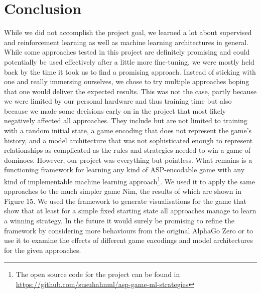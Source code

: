 \documentclass[12pt,a4paper]{article}
\begin{document}
\section{Conclusion}
While we did not accomplish the project goal, we learned a lot about supervised and reinforcement learning as well as machine learning architectures in general. While some approaches tested in this project are definitely promising and could potentially be used effectively after a little more fine-tuning, we were mostly held back by the time it took us to find a promising approach. Instead of sticking with one and really immersing ourselves, we chose to try multiple approaches hoping that one would deliver the expected results. This was not the case, partly because we were limited by our personal hardware and thus training time but also because we made some decisions early on in the project that most likely negatively affected all approaches. They include but are not limited to training with a random initial state, a game encoding that does not represent the game’s history, and a model architecture that was not sophisticated enough to represent relationships as complicated as the rules and strategies needed to win a game of dominoes.
However, our project was everything but pointless. What remains is a functioning framework for learning any kind of ASP-encodable game with any kind of implementable machine learning approach\footnote{The open source code for the project can be found in\\ \url{https://github.com/susuhahnml/asp-game-ml-strategies}}. We used it to apply the same approaches to the much simpler game Nim, the results of which are shown in Figure 15. We used the framework to generate visualisations for the game that show that at least for a simple fixed starting state all approaches manage to learn a winning strategy. In the future it would surely be promising to refine the framework by considering more behaviours from the original AlphaGo Zero or to use it to examine the effects of different game encodings and model architectures for the given approaches.
\end{document}

